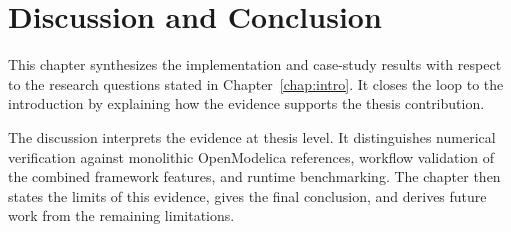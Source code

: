 \chapter{Discussion and Conclusion}
\label{chap:discussion_conclusion}

This chapter synthesizes the implementation and case-study results with respect to the research questions stated in Chapter~\ref{chap:intro}.
It closes the loop to the introduction by explaining how the evidence supports the thesis contribution.

The discussion interprets the evidence at thesis level.
It distinguishes numerical verification against monolithic OpenModelica references, workflow validation of the combined framework features, and runtime benchmarking.
The chapter then states the limits of this evidence, gives the final conclusion, and derives future work from the remaining limitations.





